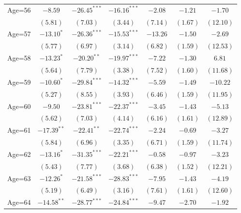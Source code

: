 \documentclass[fullpage]{paper}
\begin{document}
\begin{center}
\begin{longtable}{l c c c c c c }
Age=56      & $-8.59$       & $-26.45^{***}$ & $-16.16^{***}$ & $-2.08$       & $-1.21$       & $-1.70$       \\
            & $(5.81)$      & $(7.03)$       & $(3.44)$       & $(7.14)$      & $(1.67)$      & $(12.10)$     \\
Age=57      & $-13.10^{*}$  & $-26.36^{***}$ & $-15.53^{***}$ & $-13.26$      & $-1.50$       & $-2.69$       \\
            & $(5.77)$      & $(6.97)$       & $(3.14)$       & $(6.82)$      & $(1.59)$      & $(12.53)$     \\
Age=58      & $-13.23^{*}$  & $-20.20^{**}$  & $-19.97^{***}$ & $-7.22$       & $-1.30$       & $6.81$        \\
            & $(5.64)$      & $(7.79)$       & $(3.38)$       & $(7.52)$      & $(1.60)$      & $(11.68)$     \\
Age=59      & $-10.60^{*}$  & $-29.84^{***}$ & $-14.32^{***}$ & $-5.59$       & $-1.49$       & $-10.22$      \\
            & $(5.27)$      & $(8.55)$       & $(3.93)$       & $(6.46)$      & $(1.59)$      & $(11.95)$     \\
Age=60      & $-9.50$       & $-23.81^{***}$ & $-22.37^{***}$ & $-3.45$       & $-1.43$       & $-5.13$       \\
            & $(5.62)$      & $(7.03)$       & $(4.14)$       & $(6.16)$      & $(1.61)$      & $(12.89)$     \\
Age=61      & $-17.39^{**}$ & $-22.41^{**}$  & $-22.74^{***}$ & $-2.24$       & $-0.69$       & $-3.27$       \\
            & $(5.84)$      & $(6.96)$       & $(3.35)$       & $(6.71)$      & $(1.59)$      & $(11.74)$     \\
Age=62      & $-13.16^{*}$  & $-31.35^{***}$ & $-22.21^{***}$ & $-0.58$       & $-0.97$       & $-3.23$       \\
            & $(5.43)$      & $(7.77)$       & $(3.68)$       & $(6.38)$      & $(1.52)$      & $(12.21)$     \\
Age=63      & $-12.26^{*}$  & $-21.58^{***}$ & $-28.83^{***}$ & $-7.95$       & $-1.43$       & $-4.19$       \\
            & $(5.19)$      & $(6.49)$       & $(3.16)$       & $(7.61)$      & $(1.61)$      & $(12.60)$     \\
Age=64      & $-14.58^{**}$ & $-28.77^{***}$ & $-24.84^{***}$ & $-9.47$       & $-2.70$       & $-1.92$       \\

\end{longtable}
\end{center}
\end{document}
